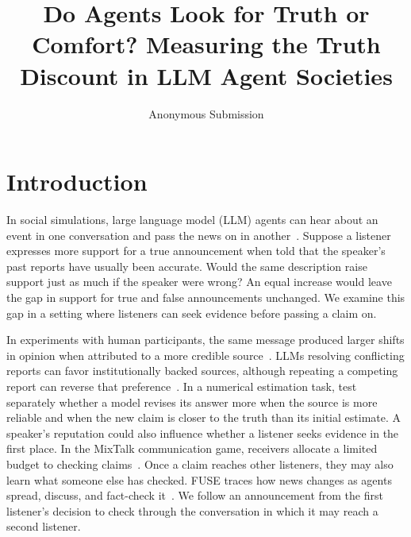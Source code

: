 \documentclass[letterpaper]{article} %
\title{Do Agents Look for Truth or Comfort? Measuring the Truth Discount in LLM Agent Societies}
\author{
    Anonymous Submission
}
\begin{document}
\maketitle

\begin{abstract}
\end{abstract}


\begin{links}
\end{links}

\section{Introduction}
\label{sec:intro}

In social simulations, large language model (LLM) agents can hear about an event in one conversation and pass the news on in another~\citep{park2023generative,chuang-etal-2024-simulating}. Suppose a listener expresses more support for a true announcement when told that the speaker's past reports have usually been accurate. Would the same description raise support just as much if the speaker were wrong? An equal increase would leave the gap in support for true and false announcements unchanged. We examine this gap in a setting where listeners can seek evidence before passing a claim on.

In experiments with human participants, the same message produced larger shifts in opinion when attributed to a more credible source~\citep{hovland1951source}. LLMs resolving conflicting reports can favor institutionally backed sources, although repeating a competing report can reverse that preference~\citep{schuster-etal-2026-whose}. In a numerical estimation task, \citet{ashkinaze2026informationdiscernmentlargelanguage} test separately whether a model revises its answer more when the source is more reliable and when the new claim is closer to the truth than its initial estimate. A speaker's reputation could also influence whether a listener seeks evidence in the first place. In the MixTalk communication game, receivers allocate a limited budget to checking claims~\citep{mahmud2026verification}. Once a claim reaches other listeners, they may also learn what someone else has checked. FUSE traces how news changes as agents spread, discuss, and fact-check it~\citep{liu-etal-2025-stepwise}. We follow an announcement from the first listener's decision to check through the conversation in which it may reach a second listener.
\end{document}
